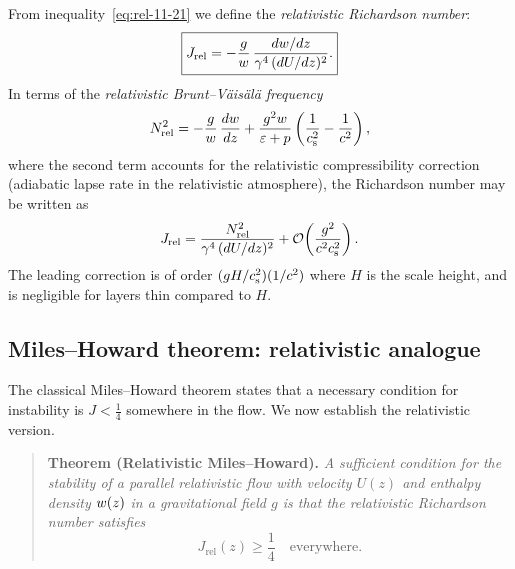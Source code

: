 From inequality~\eqref{eq:rel-11-21} we define the \emph{relativistic
Richardson number}:
\begin{equation}
\label{eq:rel-11-22}
\boxed{
J_{\mathrm{rel}}
= -\frac{g}{w}\,
  \frac{dw/dz}{\gamma^{4}\,(dU/dz)^{2}}.
}
\end{equation}
In terms of the \emph{relativistic Brunt--V\"ais\"al\"a frequency}
\begin{equation}
\label{eq:rel-11-23}
N_{\mathrm{rel}}^{2}
= -\frac{g}{w}\,\frac{dw}{dz}
  + \frac{g^{2}w}{\varepsilon+p}
  \left(\frac{1}{c_{\mathrm{s}}^{2}}-\frac{1}{c^{2}}\right),
\end{equation}
where the second term accounts for the relativistic compressibility
correction (adiabatic lapse rate in the relativistic atmosphere), the
Richardson number may be written as
\begin{equation}
\label{eq:rel-11-24}
J_{\mathrm{rel}}
= \frac{N_{\mathrm{rel}}^{2}}{\gamma^{4}\,(dU/dz)^{2}}
  + \mathcal{O}\!\left(\frac{g^{2}}{c^{2}c_{\mathrm{s}}^{2}}\right).
\end{equation}
The leading correction is of order $(g H/c_{\mathrm{s}}^{2})(1/c^{2})$ where $H$
is the scale height, and is negligible for layers thin compared to $H$.

\subsection{Miles--Howard theorem: relativistic analogue}

The classical Miles--Howard theorem states that a necessary condition
for instability is $J<\frac{1}{4}$ somewhere in the flow.  We now
establish the relativistic version.

\begin{quote}
\textbf{Theorem (Relativistic Miles--Howard).}
\textit{A sufficient condition for the stability of a parallel
relativistic flow with velocity $U(z)$ and enthalpy density
$w(z)$ in a gravitational field $g$ is that the relativistic
Richardson number satisfies}
\begin{equation}
\label{eq:rel-11-25}
\boxed{J_{\mathrm{rel}}(z) \geqslant \frac{1}{4} \quad
  \text{everywhere.}}
\end{equation}
\end{quote}

